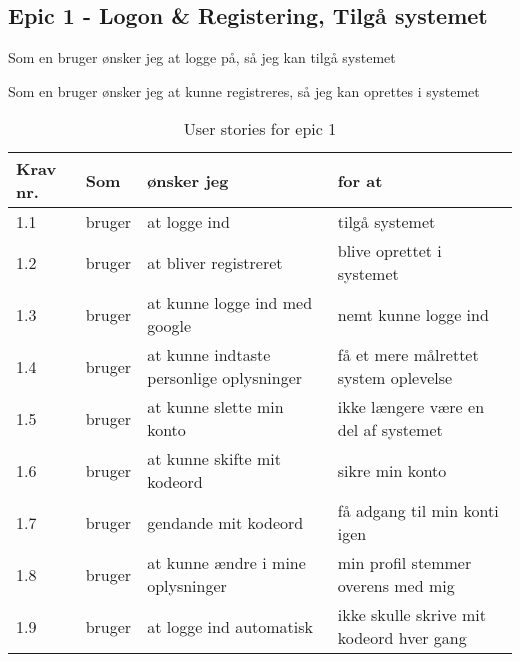 \subsection{Epic 1 - Logon \& Registering, Tilgå systemet}

Som en bruger ønsker jeg at logge på, så jeg kan tilgå systemet

Som en bruger ønsker jeg at kunne registreres, så jeg kan oprettes i systemet

\begin{table}[H]
    \centering
    \caption{User stories for epic 1}
    \label{tab:us-epic1}
    \begin{tabular}{p{1cm}|p{2cm}|p{6cm}|p{6cm}}
        \textbf{Krav nr.} & \textbf{Som} & \textbf{ønsker jeg}                      & \textbf{for at}                          \\
        \hline
        1.1               & bruger       & at logge ind                             & tilgå systemet                           \\
        \hline
        1.2               & bruger       & at bliver registreret                    & blive oprettet i systemet                \\
        \hline
        1.3               & bruger       & at kunne logge ind med google            & nemt kunne logge ind                     \\
        \hline
        1.4               & bruger       & at kunne indtaste personlige oplysninger & få et mere målrettet system oplevelse    \\
        \hline
        1.5               & bruger       & at kunne slette min konto                & ikke længere være en del af systemet     \\
        \hline
        1.6               & bruger       & at kunne skifte mit kodeord              & sikre min konto                          \\
        \hline
        1.7               & bruger       & gendande mit kodeord                     & få adgang til min konti igen             \\
        \hline
        1.8               & bruger       & at kunne ændre i mine oplysninger        & min profil stemmer overens med mig       \\
        \hline
        1.9               & bruger       & at logge ind automatisk                  & ikke skulle skrive mit kodeord hver gang \\
    \end{tabular}
\end{table}

